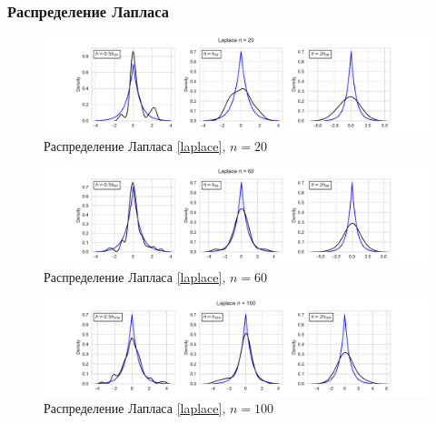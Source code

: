 \documentclass[a4paper]{article}
\begin{document}
\subsubsection{Распределение Лапласа}
\begin{figure}[H]
    \centering
    \includegraphics[width = 16 cm]{sources/laplaceKde20.pdf}
    \caption{Распределение Лапласа \eqref{laplace}, $n = 20$}
    \label{fig:laplaceKDE20}
\end{figure}
\begin{figure}[H]
    \centering
    \includegraphics[width = 16 cm]{sources/laplaceKde60.pdf}
    \caption{Распределение Лапласа \eqref{laplace}, $n = 60$}
    \label{fig:laplaceKDE60}
\end{figure}
\begin{figure}[H]
    \centering
    \includegraphics[width = 16 cm]{sources/laplaceKde100.pdf}
    \caption{Распределение Лапласа \eqref{laplace}, $n = 100$}
    \label{fig:laplaceKDE100}
\end{figure}
\end{document}
